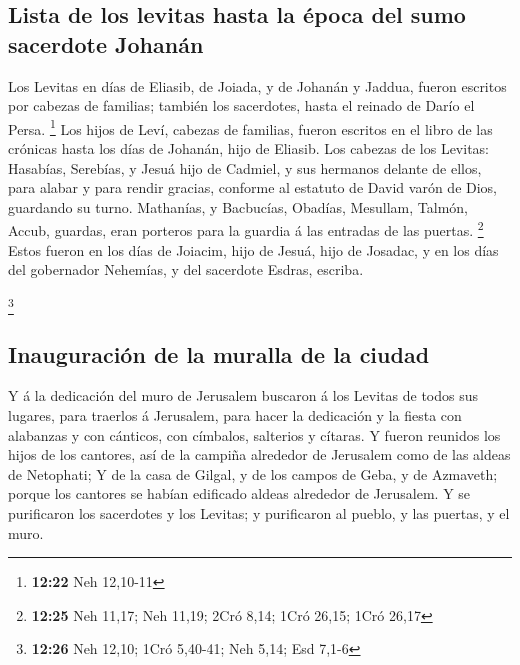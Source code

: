 \hypertarget{lista-de-los-levitas-hasta-la-uxe9poca-del-sumo-sacerdote-johanuxe1n}{%
\subsection{Lista de los levitas hasta la época del sumo sacerdote
Johanán}\label{lista-de-los-levitas-hasta-la-uxe9poca-del-sumo-sacerdote-johanuxe1n}}

 Los Levitas en días de Eliasib, de Joiada, y de Johanán y
Jaddua, fueron escritos por cabezas de familias; también los sacerdotes,
hasta el reinado de Darío el Persa. \footnote{\textbf{12:22} Neh
  12,10-11}  Los hijos de Leví, cabezas de familias, fueron
escritos en el libro de las crónicas hasta los días de Johanán, hijo de
Eliasib.  Los cabezas de los Levitas: Hasabías, Serebías, y
Jesuá hijo de Cadmiel, y sus hermanos delante de ellos, para alabar y
para rendir gracias, conforme al estatuto de David varón de Dios,
guardando su turno.  Mathanías, y Bacbucías, Obadías,
Mesullam, Talmón, Accub, guardas, eran porteros para la guardia á las
entradas de las puertas. \footnote{\textbf{12:25} Neh 11,17; Neh 11,19;
  2Cró 8,14; 1Cró 26,15; 1Cró 26,17}  Estos fueron en los
días de Joiacim, hijo de Jesuá, hijo de Josadac, y en los días del
gobernador Nehemías, y del sacerdote Esdras, escriba.

\footnote{\textbf{12:26} Neh 12,10; 1Cró 5,40-41; Neh 5,14; Esd 7,1-6}

\hypertarget{inauguraciuxf3n-de-la-muralla-de-la-ciudad}{%
\subsection{Inauguración de la muralla de la
ciudad}\label{inauguraciuxf3n-de-la-muralla-de-la-ciudad}}

 Y á la dedicación del muro de Jerusalem buscaron á los
Levitas de todos sus lugares, para traerlos á Jerusalem, para hacer la
dedicación y la fiesta con alabanzas y con cánticos, con címbalos,
salterios y cítaras.  Y fueron reunidos los hijos de los
cantores, así de la campiña alrededor de Jerusalem como de las aldeas de
Netophati;  Y de la casa de Gilgal, y de los campos de
Geba, y de Azmaveth; porque los cantores se habían edificado aldeas
alrededor de Jerusalem.  Y se purificaron los sacerdotes y
los Levitas; y purificaron al pueblo, y las puertas, y el muro.

